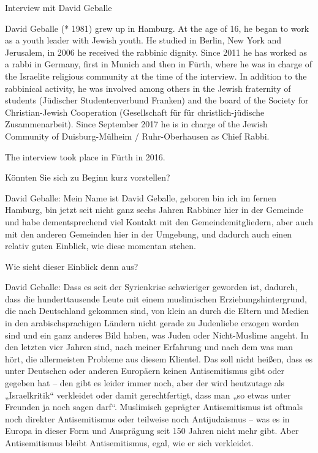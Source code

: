  

Interview mit David Geballe 

David Geballe (* 1981) grew up in Hamburg. At the age of 16, he began to work as a youth leader with Jewish youth. He studied in Berlin, New York and Jerusalem, in 2006 he received the rabbinic dignity. Since 2011 he has worked as a rabbi in Germany, first in Munich and then in Fürth, where he was in charge of the Israelite religious community at the time of the interview. In addition to the rabbinical activity, he was involved among others in the Jewish fraternity of students (Jüdischer Studentenverbund Franken) and the board of the Society for Christian-Jewish Cooperation (Gesellschaft für für christlich-jüdische Zusammenarbeit). Since September 2017 he is in charge of the Jewish Community of Duisburg-Mülheim / Ruhr-Oberhausen as Chief Rabbi. 

The interview took place in Fürth in 2016. 

Könnten Sie sich zu Beginn kurz vorstellen? 

David Geballe: Mein Name ist David Geballe, geboren bin ich im fernen Hamburg, bin jetzt seit nicht ganz sechs Jahren Rabbiner hier in der Gemeinde und habe dementsprechend viel Kontakt mit den Gemeindemitgliedern, aber auch mit den anderen Gemeinden hier in der Umgebung, und dadurch auch einen relativ guten Einblick, wie diese momentan stehen. 

Wie sieht dieser Einblick denn aus? 

David Geballe: Dass es seit der Syrienkrise schwieriger geworden ist, dadurch, dass die hunderttausende Leute mit einem muslimischen Erziehungshintergrund, die nach Deutschland gekommen sind, von klein an durch die Eltern und Medien in den arabischsprachigen Ländern nicht gerade zu Judenliebe erzogen worden sind und ein ganz anderes Bild haben, was Juden oder Nicht-Muslime angeht. In den letzten vier Jahren sind, nach meiner Erfahrung und nach dem was man hört, die allermeisten Probleme aus diesem Klientel. Das soll nicht heißen, dass es unter Deutschen oder anderen Europäern keinen Antisemitismus gibt oder gegeben hat – den gibt es leider immer noch, aber der wird heutzutage als „Israelkritik“ verkleidet oder damit gerechtfertigt, dass man „so etwas unter Freunden ja noch sagen darf“. Muslimisch geprägter Antisemitismus ist oftmals noch direkter Antisemitismus oder teilweise noch Antijudaismus – was es in Europa in dieser Form und Ausprägung seit 150 Jahren nicht mehr gibt. Aber Antisemitismus bleibt Antisemitismus, egal, wie er sich verkleidet. 

